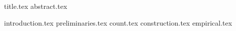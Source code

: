 \documentclass[11pt]{llncs}
\begin{document}
{title.tex}
\thispagestyle{plain}
{abstract.tex}

{introduction.tex}
{preliminaries.tex}
{count.tex}
{construction.tex}
{empirical.tex}


\end{document}
